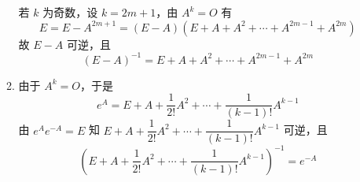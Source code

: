 \begin{enumerate}
\begin{enumerate}
                    若 $ k $ 为奇数，设 $ k = 2m + 1 $，由 $ A^k = O $ 有
                    \[ E = E - A^{2m + 1} = (E - A)(E + A + A^2 + \cdots + A^{2m - 1} + A^{2m}) \]
                    故 $ E - A $ 可逆，且
                    \[ (E - A)^{-1} = E + A + A^2 + \cdots + A^{2m - 1} + A^{2m} \]

              \item 由于 $ A^k = O $，于是
                    \[ e^A = E + A + \frac{1}{2!} A^2 + \cdots + \frac{1}{(k - 1)!} A^{k - 1} \]
                    由 $ e^A e^{-A} = E $ 知 $ E + A + \dfrac{1}{2!} A^2 + \cdots + \dfrac{1}{(k - 1)!} A^{k - 1} $ 可逆，且
                    \[ (E + A + \frac{1}{2!} A^2 + \cdots + \frac{1}{(k - 1)!} A^{k - 1})^{-1} = e^{-A} \]
          \end{enumerate}
\end{enumerate}

